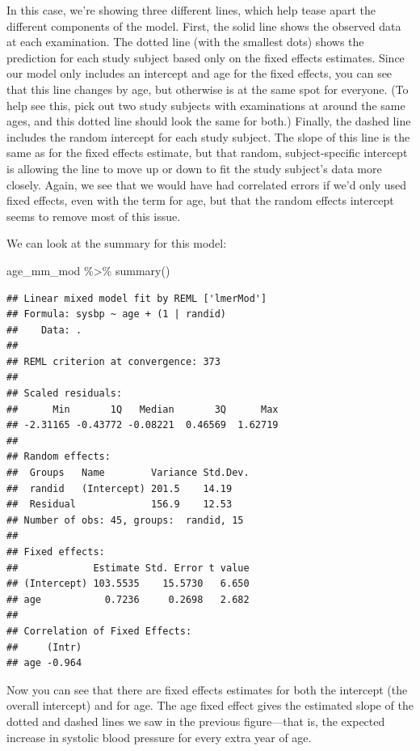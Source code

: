 \documentclass[
]{book}
\newenvironment{Shaded}{\begin{snugshade}}{\end{snugshade}}
\newcommand{\FunctionTok}[1]{\textcolor[rgb]{0.00,0.00,0.00}{#1}}
\newcommand{\NormalTok}[1]{#1}
\newcommand{\SpecialCharTok}[1]{\textcolor[rgb]{0.00,0.00,0.00}{#1}}
\begin{document}
In this case, we're showing three different lines, which help tease apart the
different components of the model. First, the solid line shows the observed data
at each examination. The dotted line (with the smallest dots) shows the
prediction for each study subject based only on the fixed effects estimates.
Since our model only includes an intercept and age for the fixed effects, you
can see that this line changes by age, but otherwise is at the same spot for
everyone. (To help see this, pick out two study subjects with examinations at
around the same ages, and this dotted line should look the same for both.)
Finally, the dashed line includes the random intercept for each study subject.
The slope of this line is the same as for the fixed effects estimate, but that
random, subject-specific intercept is allowing the line to move up or down to
fit the study subject's data more closely. Again, we see that we would have
had correlated errors if we'd only used fixed effects, even with the term for
age, but that the random effects intercept seems to remove most of this issue.

We can look at the summary for this model:

\begin{Shaded}
\begin{Highlighting}[]
\NormalTok{age\_mm\_mod }\SpecialCharTok{\%\textgreater{}\%} 
  \FunctionTok{summary}\NormalTok{()}
\end{Highlighting}
\end{Shaded}

\begin{verbatim}
## Linear mixed model fit by REML ['lmerMod']
## Formula: sysbp ~ age + (1 | randid)
##    Data: .
## 
## REML criterion at convergence: 373
## 
## Scaled residuals: 
##      Min       1Q   Median       3Q      Max 
## -2.31165 -0.43772 -0.08221  0.46569  1.62719 
## 
## Random effects:
##  Groups   Name        Variance Std.Dev.
##  randid   (Intercept) 201.5    14.19   
##  Residual             156.9    12.53   
## Number of obs: 45, groups:  randid, 15
## 
## Fixed effects:
##             Estimate Std. Error t value
## (Intercept) 103.5535    15.5730   6.650
## age           0.7236     0.2698   2.682
## 
## Correlation of Fixed Effects:
##     (Intr)
## age -0.964
\end{verbatim}

Now you can see that there are fixed effects estimates for both the intercept
(the overall intercept) and for age. The age fixed effect gives the estimated
slope of the dotted and dashed lines we saw in the previous figure---that is,
the expected increase in systolic blood pressure for every extra year of age.
\end{document}
